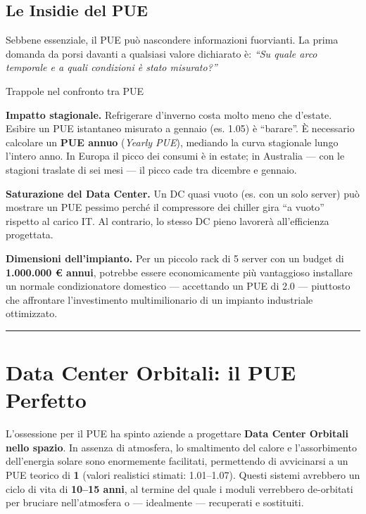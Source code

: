 \documentclass[
  italian,
  openany]{book}
\begin{document}
\subsection{Le Insidie del PUE}\label{le-insidie-del-pue}

Sebbene essenziale, il PUE può nascondere informazioni fuorvianti. La
prima domanda da porsi davanti a qualsiasi valore dichiarato è:
\emph{``Su quale arco temporale e a quali condizioni è stato
misurato?''}

\begin{calloutwarning}{Trappole nel confronto tra PUE}

\textbf{Impatto stagionale.} Refrigerare d'inverno costa molto meno che
d'estate. Esibire un PUE istantaneo misurato a gennaio (es. 1.05) è
``barare''. È necessario calcolare un \textbf{PUE annuo} (\emph{Yearly
PUE}), mediando la curva stagionale lungo l'intero anno. In Europa il
picco dei consumi è in estate; in Australia --- con le stagioni traslate
di sei mesi --- il picco cade tra dicembre e gennaio.

\textbf{Saturazione del Data Center.} Un DC quasi vuoto (es. con un solo
server) può mostrare un PUE pessimo perché il compressore dei chiller
gira ``a vuoto'' rispetto al carico IT. Al contrario, lo stesso DC pieno
lavorerà all'efficienza progettata.

\textbf{Dimensioni dell'impianto.} Per un piccolo rack di 5 server con
un budget di \textbf{1.000.000 € annui}, potrebbe essere economicamente
più vantaggioso installare un normale condizionatore domestico ---
accettando un PUE di 2.0 --- piuttosto che affrontare l'investimento
multimilionario di un impianto industriale ottimizzato.

\end{calloutwarning}

\begin{center}\rule{0.5\linewidth}{0.5pt}\end{center}

\section{Data Center Orbitali: il PUE
Perfetto}\label{data-center-orbitali-il-pue-perfetto}

L'ossessione per il PUE ha spinto aziende a progettare \textbf{Data
Center Orbitali nello spazio}. In assenza di atmosfera, lo smaltimento
del calore e l'assorbimento dell'energia solare sono enormemente
facilitati, permettendo di avvicinarsi a un PUE teorico di \textbf{1}
(valori realistici stimati: 1.01--1.07). Questi sistemi avrebbero un
ciclo di vita di \textbf{10--15 anni}, al termine del quale i moduli
verrebbero de-orbitati per bruciare nell'atmosfera o --- idealmente ---
recuperati e sostituiti.
\end{document}
